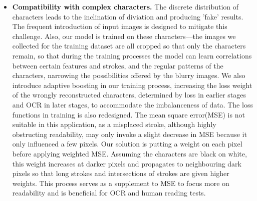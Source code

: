 \begin{itemize}[leftmargin=*]
  \item \textbf{Compatibility with complex characters.} The discrete distribution of characters leads to the inclination of diviation and producing 'fake' results. The frequent introduction of input images is designed to mitigate this challenge. Also, our model is trained on these characters---the images we collected for the training dataset are all cropped so that only the characters remain, so that during the training processes the model can learn correlations between certain features and strokes, and the regular patterns of the characters, narrowing the possibilities offered by the blurry images. We also introduce adaptive boosting\cite{adaboost} in our training process, increasing the loss weight of the wrongly reconstructed characters, determined by loss in earlier stages and OCR in later stages, to accommodate the imbalanceness of data. The loss functions in training is also redesigned. The mean square error(MSE) is not suitable in this application, as a misplaced stroke, although highly obstructing readability, may only invoke a slight decrease in MSE because it only influenced a few pixels. Our solution is putting a weight on each pixel before applying weighted MSE. Assuming the characters are black on white, this weight increases at darker pixels and propagates to neighbouring dark pixels so that long strokes and intersections of strokes are given higher weights. This process serves as a supplement to MSE to focus more on readability and is beneficial for OCR and human reading tests. 
\end{itemize}

